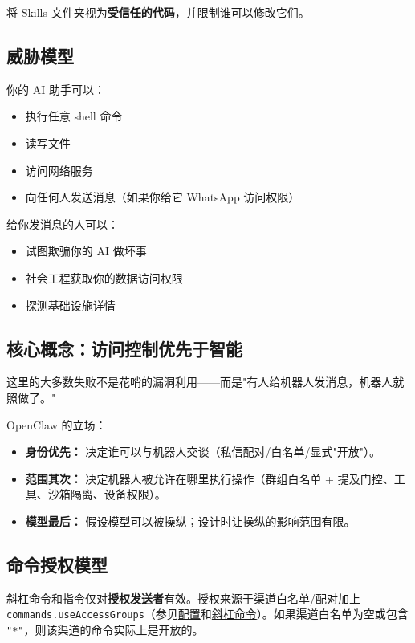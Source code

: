 将 Skills 文件夹视为\textbf{受信任的代码}，并限制谁可以修改它们。

\subsection{威胁模型}


你的 AI 助手可以：

\begin{itemize}
  \item 执行任意 shell 命令
  \item 读写文件
  \item 访问网络服务
  \item 向任何人发送消息（如果你给它 WhatsApp 访问权限）
\end{itemize}


给你发消息的人可以：

\begin{itemize}
  \item 试图欺骗你的 AI 做坏事
  \item 社会工程获取你的数据访问权限
  \item 探测基础设施详情
\end{itemize}


\subsection{核心概念：访问控制优先于智能}


这里的大多数失败不是花哨的漏洞利用——而是"有人给机器人发消息，机器人就照做了。"

OpenClaw 的立场：

\begin{itemize}
  \item \textbf{身份优先：} 决定谁可以与机器人交谈（私信配对/白名单/显式"开放"）。
  \item \textbf{范围其次：} 决定机器人被允许在哪里执行操作（群组白名单 + 提及门控、工具、沙箱隔离、设备权限）。
  \item \textbf{模型最后：} 假设模型可以被操纵；设计时让操纵的影响范围有限。
\end{itemize}


\subsection{命令授权模型}


斜杠命令和指令仅对\textbf{授权发送者}有效。授权来源于渠道白名单/配对加上 \texttt{commands.useAccessGroups}（参见\href{/gateway/configuration}{配置}和\href{/tools/slash-commands}{斜杠命令}）。如果渠道白名单为空或包含 \texttt{"*"}，则该渠道的命令实际上是开放的。

